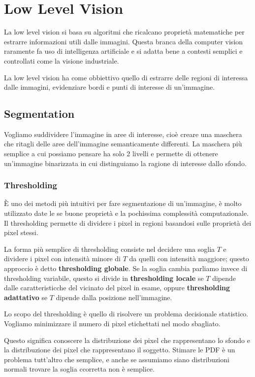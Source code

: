 \chapter{Low Level Vision}
La low level vision si basa su algoritmi che ricalcano proprietà matematiche per estrarre informazioni utili dalle immagini. Questa branca della computer vision raramente fa uso di intelligenza artificiale e si adatta bene a contesti semplici e controllati come la visione industriale.

La low level vision ha come obbiettivo quello di estrarre delle regioni di interessa dalle immagini, evidenziare bordi e punti di interesse di un'immagine.

\section{Segmentation}
Vogliamo suddividere l'immagine in aree di interesse, cioè creare una maschera che ritagli delle aree dell'immagine semanticamente differenti. La maschera più semplice a cui possiamo pensare ha solo 2 livelli e permette di ottenere un'immagine binarizzata in cui distinguiamo la ragione di interesse dallo sfondo.

\subsection{Thresholding}
È uno dei metodi più intuitivi per fare segmentazione di un'immagine, è molto utilizzato date le se buone proprietà e la pochissima complessità computazionale. Il thresholding permette di dividere i pixel in regioni basandosi sulle proprietà dei pixel stessi.

La forma più semplice di thresholding consiste nel decidere una soglia $T$ e dividere i pixel con intensità minore di $T$ da quelli con intensità maggiore; questo approccio è detto \textbf{thresholding globale}. Se la soglia cambia parliamo invece di thresholding variabile, questo si divide in \textbf{thresholding locale} se $T$ dipende dalle caratteristicche del vicinato del pixel in esame, oppure \textbf{thresholding adattativo} se $T$ dipende dalla posizione nell'immagine.

Lo scopo del thresholding è quello di risolvere un problema decisionale statistico. Vogliamo minimizzare il numero di pixel etichettati nel modo sbagliato.  

Questo significa conoscere la distribuzione dei pixel che rappresentano lo sfondo e la distribuzione dei pixel che rappresentano il soggetto. Stimare le PDF è un problema tutt'altro che semplice, e anche se assumiamo siano distribuzioni normali trovare la soglia ccorretta non è semplice.

